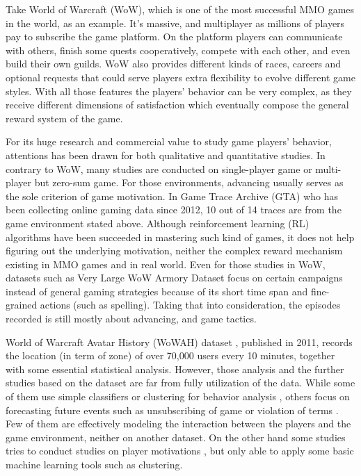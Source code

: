\documentclass{sigchi}
\begin{document}
Take World of Warcraft (WoW), which is one of the most successful MMO games in the world, as an example. 
It's massive, and multiplayer as millions of players pay to subscribe the game platform. 
On the platform players can communicate with others, finish some quests cooperatively, compete with each other, and even build their own guilds. 
WoW also provides different kinds of races, careers and optional requests that could serve players extra flexibility to evolve different game styles. 
With all those features the players' behavior can be very complex, as they receive different dimensions of satisfaction which eventually compose the general reward system of the game.

For its huge research and commercial value to study game players' behavior, attentions has been drawn for both qualitative and quantitative studies.
In contrary to WoW, many studies are conducted on single-player game or multi-player but zero-sum game. 
For those environments, advancing usually serves as the sole criterion of game motivation.
In Game Trace Archive (GTA) \cite{guo2012game} who has been collecting online gaming data since 2012, 10 out of 14 traces are from the game environment stated above.
Although reinforcement learning (RL) algorithms have been succeeded in mastering such kind of games, it does not help figuring out the underlying motivation, neither the complex reward mechanism existing in MMO games and in real world. 
Even for those studies in WoW, datasets such as Very Large WoW Armory Dataset \cite{Bell2013a} focus on certain campaigns instead of general gaming strategies because of its short time span and fine-grained actions (such as spelling).
Taking that into consideration, the episodes recorded is still mostly about advancing, and game tactics.

World of Warcraft Avatar History (WoWAH) dataset \cite{lee2011world}, published in 2011, records the location (in term of zone) of over 70,000 users every 10 minutes, together with some essential statistical analysis. 
However, those analysis and the further studies based on the dataset are far from fully utilization of the data. 
While some of them use simple classifiers or clustering for behavior analysis \cite{suznjevic2011mmorpg,drachen2014comparison}, others focus on forecasting future events such as unsubscribing of game or violation of terms \cite{bauckhage2015clustering,thawonmas2011analysis,lou2012forecasting}. 
Few of them are effectively modeling the interaction between the players and the game environment, neither on another dataset. 
On the other hand some studies tries to conduct studies on player motivations \cite{Bell2013a}, but only able to apply some basic machine learning tools such as clustering.  
\end{document}
